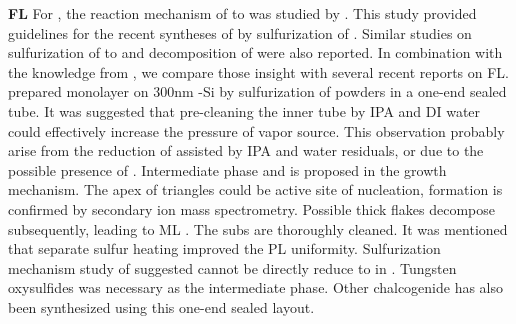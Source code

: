 \textbf{ FL} For , the reaction mechanism of  to  was studied by \citeauthor{Weber1996}.\cite{Weber1996} This study provided guidelines for the recent syntheses of  by sulfurization of .\cite{Lin2012,Lee2012b,Liu2012a,Najmaei2013} Similar studies on sulfurization of  to  and decomposition of  were also reported.\cite{VanderVlies2002,VanderVlies2002a} In combination with the knowledge from , we compare those insight with several recent reports on  FL. \citeauthor{Cong2013} prepared monolayer  on 300nm -Si by sulfurization of  powders in a one-end sealed tube.\cite{Cong2013} It was suggested that pre-cleaning the inner tube by IPA and DI water could effectively increase the pressure of vapor source. This observation probably arise from the reduction of  assisted by IPA and water residuals, or due to the possible presence of . Intermediate phase  and  is proposed in the growth mechanism. The apex of triangles could be active site of nucleation,  formation is confirmed by secondary ion mass spectrometry. Possible thick  flakes decompose subsequently, leading to ML . The subs are thoroughly cleaned. It was mentioned that separate sulfur heating improved the PL uniformity. Sulfurization mechanism study of  suggested  cannot be directly reduce to  in .\cite{VanderVlies2002,VanderVlies2002a} Tungsten oxysulfides was necessary as the intermediate phase. Other chalcogenide has also been synthesized using this one-end sealed layout.\cite{Mukherjee2013}

